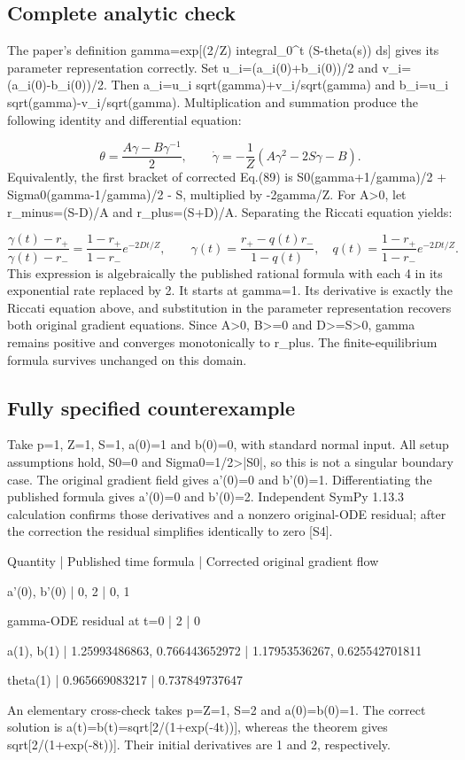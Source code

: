 \documentclass[10pt]{article}
\begin{document}
\subsection*{Complete analytic check}
The paper’s definition gamma=exp[(2/Z) integral\_0\textasciicircum{}t (S-theta(s)) ds] gives its parameter representation correctly. Set u\_i=(a\_i(0)+b\_i(0))/2 and v\_i=(a\_i(0)-b\_i(0))/2. Then a\_i=u\_i sqrt(gamma)+v\_i/sqrt(gamma) and b\_i=u\_i sqrt(gamma)-v\_i/sqrt(gamma). Multiplication and summation produce the following identity and differential equation:\par
\[\theta=\frac{A\gamma-B\gamma^{-1}}{2},\qquad
\dot\gamma=-\frac{1}{Z}\left(A\gamma^2-2S\gamma-B\right).\] Equivalently, the first bracket of corrected Eq.(89) is S0(gamma+1/gamma)/2 + Sigma0(gamma-1/gamma)/2 - S, multiplied by -2gamma/Z. For A>0, let r\_minus=(S-D)/A and r\_plus=(S+D)/A. Separating the Riccati equation yields:\par
\[\frac{\gamma(t)-r_+}{\gamma(t)-r_-}
 =\frac{1-r_+}{1-r_-}e^{-2Dt/Z},
\qquad
\gamma(t)=\frac{r_+-q(t)r_-}{1-q(t)},\quad
q(t)=\frac{1-r_+}{1-r_-}e^{-2Dt/Z}.\] This expression is algebraically the published rational formula with each 4 in its exponential rate replaced by 2. It starts at gamma=1. Its derivative is exactly the Riccati equation above, and substitution in the parameter representation recovers both original gradient equations. Since A>0, B>=0 and D>=S>0, gamma remains positive and converges monotonically to r\_plus. The finite-equilibrium formula survives unchanged on this domain.\par
\subsection*{Fully specified counterexample}
Take p=1, Z=1, S=1, a(0)=1 and b(0)=0, with standard normal input. All setup assumptions hold, S0=0 and Sigma0=1/2>|S0|, so this is not a singular boundary case. The original gradient field gives a’(0)=0 and b’(0)=1. Differentiating the published formula gives a’(0)=0 and b’(0)=2. Independent SymPy 1.13.3 calculation confirms those derivatives and a nonzero original-ODE residual; after the correction the residual simplifies identically to zero [S4].\par
Quantity | Published time formula | Corrected original gradient flow\par
a’(0), b’(0) | 0, 2 | 0, 1\par
gamma-ODE residual at t=0 | 2 | 0\par
a(1), b(1) | 1.25993486863, 0.766443652972 | 1.17953536267, 0.625542701811\par
theta(1) | 0.965669083217 | 0.737849737647\par
An elementary cross-check takes p=Z=1, S=2 and a(0)=b(0)=1. The correct solution is a(t)=b(t)=sqrt[2/(1+exp(-4t))], whereas the theorem gives sqrt[2/(1+exp(-8t))]. Their initial derivatives are 1 and 2, respectively.\par
\end{document}

